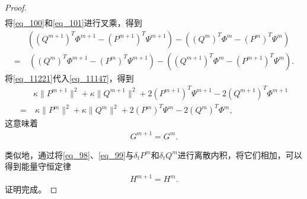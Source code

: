 \begin{proof}
\begin{align}
\end{align}
将\eqref{eq_100}和\eqref{eq_101}进行叉乘，得到
\begin{align}\label{eq_11221}
&((Q^{m+1})^{T}\varPhi^{m+1}-(P^{m+1})^{T}\Psi^{m+1})-((Q^{m})^{T}\varPhi^{m}-(P^{m})^{T}\Psi^{m})\nonumber\\
=&~((Q^{m})^{T}\varPhi^{m+1}-(P^{m})^{T}\Psi^{m+1})-((Q^{m+1})^{T}\varPhi^{m}-(P^{m+1})^{T}\Psi^{m}).
\end{align}
将\eqref{eq_11221}代入\eqref{eq_11147}，得到
\begin{align}
&\kappa \|P^{m+1}\|^2+\kappa \|Q^{m+1}\|^2+2(P^{m+1})^{T}\Psi^{m+1}-2(Q^{m+1})^{T}\varPhi^{m+1}\nonumber
\\=&~\kappa \|P^{m}\|^2+\kappa \|Q^{m}\|^2+2(P^{m})^{T}\Psi^{m}-2(Q^{m})^{T}\varPhi^{m},\label{eq_11155}
\end{align}
这意味着
\begin{align}\label{eq_11149}
G^{m+1}=G^{m} .
\end{align}

类似地，通过将\eqref{eq_98}、\eqref{eq_99}与$\delta_t P^{m}$和$\delta_t Q^{m}$进行离散内积，将它们相加，可以得到能量守恒定律
\begin{align}\label{eq_11156}
H^{m+1}=H^{m}.
\end{align}
证明完成。
\end{proof}

